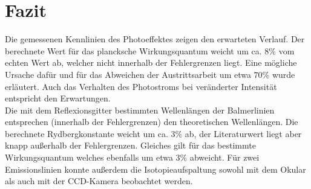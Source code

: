 \section{Fazit}
Die gemessenen Kennlinien des Photoeffektes zeigen den erwarteten Verlauf. Der berechnete Wert für das plancksche Wirkungsquantum weicht um ca. $8\%$ vom echten Wert ab, welcher nicht innerhalb der Fehlergrenzen liegt. Eine mögliche Ursache dafür und für das Abweichen der Austrittsarbeit um etwa $70\%$ wurde erläutert. Auch das Verhalten des Photostroms bei veränderter Intensität entspricht den Erwartungen. \\

Die mit dem Reflexionsgitter bestimmten Wellenlängen der Balmerlinien entsprechen (innerhalb der Fehlergrenzen) den theoretischen Wellenlängen. Die berechnete Rydbergkonstante weicht um ca. $3\%$ ab, der Literaturwert liegt aber knapp außerhalb der Fehlergrenzen. Gleiches gilt für das bestimmte Wirkungsquantum welches ebenfalls um etwa $3\%$ abweicht. Für zwei Emissionslinien konnte außerdem die Isotopieaufspaltung sowohl mit dem Okular als auch mit der CCD-Kamera beobachtet werden. 
